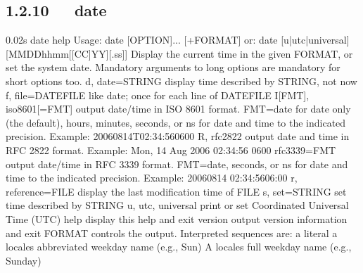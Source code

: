 \documentclass[letterpaper,12pt,english]{sphinxmanual}
\begin{document}
\subsection{1.2.10   date}
\label{\detokenize{001software/001install/linux:date}}
\begin{sphinxVerbatim}[commandchars=\\\{\}]
0.02s\PYGZdl{} date \PYGZhy{}\PYGZhy{}help
Usage: date [OPTION]... [+FORMAT]
  or:  date [\PYGZhy{}u|\PYGZhy{}\PYGZhy{}utc|\PYGZhy{}\PYGZhy{}universal] [MMDDhhmm[[CC]YY][.ss]]
Display the current time in the given FORMAT, or set the system date.
Mandatory arguments to long options are mandatory for short options too.
  \PYGZhy{}d, \PYGZhy{}\PYGZhy{}date=STRING          display time described by STRING, not \PYGZsq{}now\PYGZsq{}
  \PYGZhy{}f, \PYGZhy{}\PYGZhy{}file=DATEFILE        like \PYGZhy{}\PYGZhy{}date; once for each line of DATEFILE
  \PYGZhy{}I[FMT], \PYGZhy{}\PYGZhy{}iso\PYGZhy{}8601[=FMT]  output date/time in ISO 8601 format.
                               FMT=\PYGZsq{}date\PYGZsq{} for date only (the default),
                               \PYGZsq{}hours\PYGZsq{}, \PYGZsq{}minutes\PYGZsq{}, \PYGZsq{}seconds\PYGZsq{}, or \PYGZsq{}ns\PYGZsq{}
                               for date and time to the indicated precision.
                               Example: 2006\PYGZhy{}08\PYGZhy{}14T02:34:56\PYGZhy{}0600
  \PYGZhy{}R, \PYGZhy{}\PYGZhy{}rfc\PYGZhy{}2822             output date and time in RFC 2822 format.
                               Example: Mon, 14 Aug 2006 02:34:56 \PYGZhy{}0600
      \PYGZhy{}\PYGZhy{}rfc\PYGZhy{}3339=FMT         output date/time in RFC 3339 format.
                               FMT=\PYGZsq{}date\PYGZsq{}, \PYGZsq{}seconds\PYGZsq{}, or \PYGZsq{}ns\PYGZsq{}
                               for date and time to the indicated precision.
                               Example: 2006\PYGZhy{}08\PYGZhy{}14 02:34:56\PYGZhy{}06:00
  \PYGZhy{}r, \PYGZhy{}\PYGZhy{}reference=FILE       display the last modification time of FILE
  \PYGZhy{}s, \PYGZhy{}\PYGZhy{}set=STRING           set time described by STRING
  \PYGZhy{}u, \PYGZhy{}\PYGZhy{}utc, \PYGZhy{}\PYGZhy{}universal     print or set Coordinated Universal Time (UTC)
      \PYGZhy{}\PYGZhy{}help     display this help and exit
      \PYGZhy{}\PYGZhy{}version  output version information and exit
FORMAT controls the output.  Interpreted sequences are:
  \PYGZpc{}\PYGZpc{}   a literal \PYGZpc{}
  \PYGZpc{}a   locale\PYGZsq{}s abbreviated weekday name (e.g., Sun)
  \PYGZpc{}A   locale\PYGZsq{}s full weekday name (e.g., Sunday)

\end{sphinxVerbatim}
\end{document}
